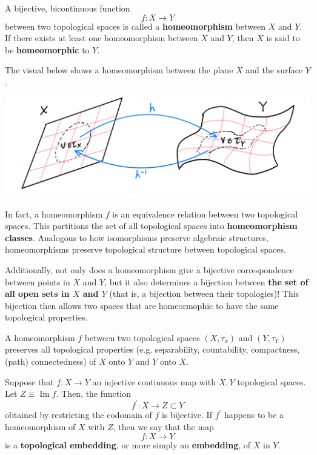 \documentclass{article}
\DeclareMathOperator{\im}{Im}
\begin{document}
    \begin{definition}[Homeomorphism]
    A bijective, bicontinuous function 
    \[f: X \longrightarrow Y\]
    between two topological spaces is called a \textbf{homeomorphism} between $X$ and $Y$. If there exists at least one homeomorphism between $X$ and $Y$, then $X$ is said to be \textbf{homeomorphic} to $Y$. 

    The visual below shows a homeomorphism between the plane $X$ and the surface $Y$. 
    \begin{center}
        \includegraphics[scale=0.25]{img/Homeomorphism_of_Plane.PNG}
    \end{center}
    \end{definition}

    In fact, a homeomorphism $f$ is an equivalence relation between two topological spaces. This partitions the set of all topological spaces into \textbf{homeomorphism classes}. Analogous to how isomorphisms preserve algebraic structures, homeomorphisms preserve topological structure between topological spaces. 

    Additionally, not only does a homeomorphism give a bijective correspondence between points in $X$ and $Y$, but it also determines a bijection between \textbf{the set of all open sets in $X$ and $Y$} (that is, a bijection between their topologies)! This bijection then allows two spaces that are homeormophic to have the same topological properties. 

    \begin{proposition}
    A homeomorphism $f$ between two topological spaces $(X, \tau_{x})$ and $(Y, \tau_{Y})$ preserves all topological properties (e.g. separability, countability, compactness, (path) connectedness) of $X$ onto $Y$ and $Y$ onto $X$. 
    \end{proposition}

    \begin{definition}
    Suppose that $f: X \longrightarrow Y$ an injective continuous map with $X, Y$ topological spaces. Let $Z \equiv \im{f}$. Then, the function
    \[f^\prime: X \longrightarrow Z \subset Y\]
    obtained by restricting the codomain of $f$ is bijective. If $f^\prime$ happens to be a homeomorphism of $X$ with $Z$, then we say that the map
    \[f: X \longrightarrow Y\]
    is a \textbf{topological embedding}, or more simply an \textbf{embedding}, of $X$ in $Y$. 
    \end{definition}
\end{document}
